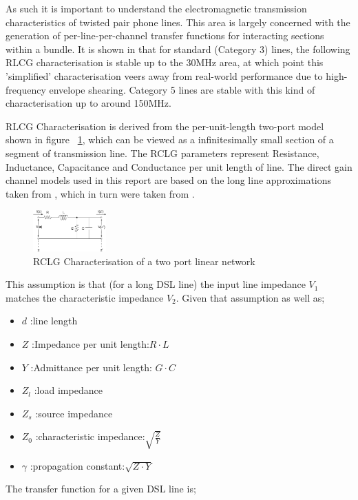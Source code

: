 As such it is important to understand the electromagnetic transmission characteristics of twisted pair phone lines. This area is largely concerned with the generation of per-line-per-channel transfer functions for interacting sections within a bundle. It is shown in \cite{TS99} that for standard (Category 3) lines, the following RLCG characterisation is stable up to the 30MHz area, at which point this 'simplified' characterisation veers away from real-world performance due to high-frequency envelope shearing. Category 5 lines are stable with this kind of characterisation up to around 150MHz. 

RLCG Characterisation is derived from the per-unit-length two-port model shown in figure ~\ref{fig:rclg}, which can be viewed as a infinitesimally small section of a segment of transmission line. The RCLG parameters represent Resistance, Inductance, Capacitance and Conductance per unit length of line. The direct gain channel models used in this report are based on the long line approximations taken from \cite{AM09}, which in turn were taken from \cite{TS99}.

\begin{figure}[h!]
  \centering
  \includegraphics[width=0.25\textwidth]{images/rclg.png}
  \caption{RCLG Characterisation of a two port linear network}
  \label{fig:rclg}
\end{figure}

This assumption is that (for a long DSL line) the input line impedance \(V_1\) matches the characteristic impedance \(V_2\). Given that assumption as well as;
\begin{itemize}
\item \(d\) :line length
\item \(Z\) :Impedance per unit length:\(R \cdot L\)
\item \(Y\) :Admittance per unit length: \(G \cdot C\)
\item \(Z_l\) :load impedance
\item \(Z_s\) :source impedance
\item \(Z_0\) :characteristic impedance:\(\sqrt{\frac{Z}{Y}}\)
\item \(\gamma\) :propagation constant:\(\sqrt{Z \cdot Y}\)
\end{itemize}

The transfer function for a given DSL line is;

